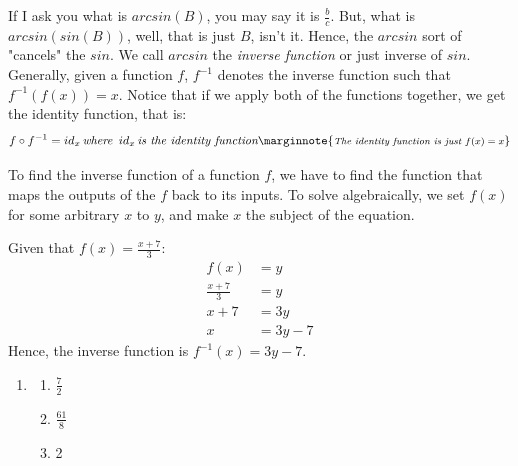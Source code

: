 If I ask you what is \(arcsin(B)\), you may say it is \(\frac{b}{c}\). But, what is \(arcsin(sin(B))\), well, that is just \(B\), isn't it. Hence, the \(arcsin\) sort of "cancels" the \(sin\). We call \(arcsin\) the \textit{inverse function} or just inverse of \(sin\). Generally, given a function \(f\), \(f^{-1}\) denotes the inverse function such that \(f^{-1}(f(x))=x\). Notice that if we apply both of the functions together, we get the identity function, that is:
\begin{equation}
  f \circ f^{-1} = id_x \textit{\,where \,} id_x \textit{\,is the identity function}
  \marginnote{\footnotesize \textit{The identity function is just \(f(x)=x\)}}
\end{equation}

To find the inverse function of a function \(f\), we have to find the function that maps the outputs of the \(f\) back to its inputs. To solve algebraically, we set \(f(x)\) for some arbitrary \(x\) to \(y\), and make \(x\) the subject of the equation.
\begin{example}
  Given that \(f(x)=\frac{x+7}{3}\):
  \begin{align*}
    f(x)&=y \\
    \frac{x+7}{3}&=y \\
    x+7&=3y \\
    x&=3y-7
  \end{align*}
  Hence, the inverse function is \(f^{-1}(x)=3y-7\).
\end{example}

\begin{Exercise}
\end{Exercise}
\begin{Solution}
  \begin{enumerate}
    \item{
        \begin{enumerate}
          \item{\(\frac{7}{2}\)}
          \item{\(\frac{61}{8}\)}
          \item{2}
        \end{enumerate}
      } 
  \end{enumerate} 
\end{Solution}
